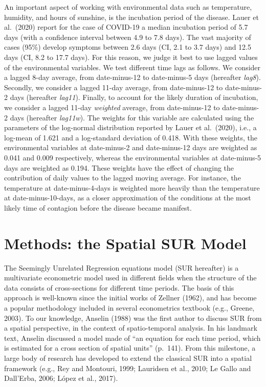 \documentclass[]{elsarticle} %
\begin{document}
An important aspect of working with environmental data such as
temperature, humidity, and hours of sunshine, is the incubation period
of the disease. Lauer et al.~(2020) report for the case of COVID-19 a
median incubation period of 5.7 days (with a confidence interval between
4.9 to 7.8 days). The vast majority of cases (95\%) develop symptoms
between 2.6 days (CI, 2.1 to 3.7 days) and 12.5 days (CI, 8.2 to 17.7
days). For this reason, we judge it best to use lagged values of the
environmental variables. We test different time lags as follows. We
consider a lagged 8-day average, from date-minus-12 to date-minus-5 days
(hereafter \emph{lag8}). Secondly, we consider a lagged 11-day average,
from date-minus-12 to date-minus-2 days (hereafter \emph{lag11}).
Finally, to account for the likely duration of incubation, we consider a
lagged 11-day \emph{weighted} average, from date-minus-12 to
date-minus-2 days (hereafter \emph{lag11w}). The weights for this
variable are calculated using the parameters of the log-normal
distribution reported by Lauer et al.~(2020), i.e., a log-mean of 1.621
and a log-standard deviation of 0.418. With these weights, the
environmental variables at date-minus-2 and date-minus-12 days are
weighted as 0.041 and 0.009 respectively, whereas the environmental
variables at date-minus-5 days are weighted as 0.194. These weights have
the effect of changing the contribution of daily values to the lagged
moving average. For instance, the temperature at date-minus-4-days is
weighted more heavily than the temperature at date-minus-10-days, as a
closer approximation of the conditions at the most likely time of
contagion before the disease became manifest.

\hypertarget{methods}{%
\section{Methods: the Spatial SUR Model}\label{methods}}

The Seemingly Unrelated Regression equations model (SUR hereafter) is a
multivariate econometric model used in different fields when the
structure of the data consists of cross-sections for different time
periods. The basis of this approach is well-known since the initial
works of Zellner (1962), and has become a popular methodology included
in several econometrics textbook (e.g., Greene, 2003). To our knowledge,
Anselin (1988) was the first author to discuss SUR from a spatial
perspective, in the context of spatio-temporal analysis. In his landmark
text, Anselin discussed a model made of ``an equation for each time
period, which is estimated for a cross section of spatial units''
(p.~141). From this milestone, a large body of research has developed to
extend the classical SUR into a spatial framework (e.g., Rey and
Montouri, 1999; Lauridsen et al., 2010; Le Gallo and Dall'Erba, 2006;
López et al., 2017).
\end{document}
